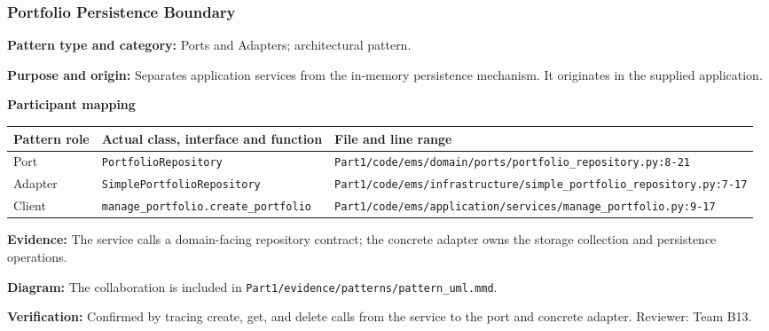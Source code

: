 \documentclass[11pt,a4paper]{article}
\newcommand{\entry}[2]{\textbf{#1:} #2\par}
\newcommand{\codepath}[1]{\nolinkurl{#1}}
\begin{document}
\subsubsection{Portfolio Persistence Boundary}
\entry{Pattern type and category}{Ports and Adapters; architectural pattern.}
\entry{Purpose and origin}{Separates application services from the in-memory persistence mechanism. It originates in the supplied application.}
\textbf{Participant mapping}\par
\begin{tabularx}{\linewidth}{@{}lXX@{}}
\toprule
Pattern role & Actual class, interface and function & File and line range\\
\midrule
Port & \codepath{PortfolioRepository} & \codepath{Part1/code/ems/domain/ports/portfolio_repository.py:8-21}\\
Adapter & \codepath{SimplePortfolioRepository} & \codepath{Part1/code/ems/infrastructure/simple_portfolio_repository.py:7-17}\\
Client & \codepath{manage_portfolio.create_portfolio} & \codepath{Part1/code/ems/application/services/manage_portfolio.py:9-17}\\
\bottomrule
\end{tabularx}
\entry{Evidence}{The service calls a domain-facing repository contract; the concrete adapter owns the storage collection and persistence operations.}
\entry{Diagram}{The collaboration is included in \codepath{Part1/evidence/patterns/pattern_uml.mmd}.}
\entry{Verification}{Confirmed by tracing create, get, and delete calls from the service to the port and concrete adapter. Reviewer: Team B13.}
\end{document}
